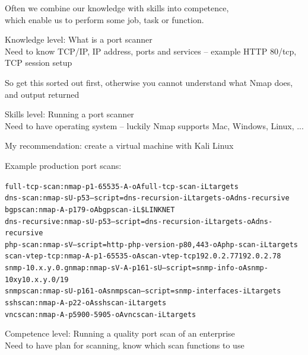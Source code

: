 \documentclass[Screen16to9,17pt]{foils}
\begin{document}
{\large Often we combine our knowledge with skills into competence, \\
which enable us to perform some job, task or function.}

\begin{list2}
\item Knowledge level: What is a port scanner\\
Need to know TCP/IP, IP address, ports and services -- example HTTP 80/tcp, TCP session setup
\end{list2}

So get this sorted out first, otherwise you cannot understand what Nmap does, and output returned




\begin{list2}
\item Skills level: Running a port scanner\\
Need to have operating system -- luckily Nmap supports Mac, Windows, Linux, ...
\item My recommendation: create a virtual machine with Kali Linux
\end{list2}


Example production port scans:
\begin{alltt}\footnotesize
full-tcp-scan: nmap -p 1-65535 -A -oA full-tcp-scan -iL targets
dns-scan: nmap -sU -p 53 --script=dns-recursion -iL targets -oA dns-recursive
bgpscan: nmap -A -p 179 -oA bgpscan -iL \$LINKNET
dns-recursive: nmap -sU -p 53 --script=dns-recursion -iL targets -oA dns-recursive
php-scan: nmap -sV --script=http-php-version -p80,443 -oA php-scan -iL targets
scan-vtep-tcp: nmap -A -p 1-65535 -oA scan-vtep-tcp 192.0.2.77 192.0.2.78
snmp-10.x.y.0.gnmap: nmap -sV -A -p 161 -sU --script=snmp-info -oA snmp-10xy 10.x.y.0/19
snmpscan: nmap -sU -p 161 -oA snmpscan --script=snmp-interfaces -iL targets
sshscan: nmap -A -p 22 -oA sshscan -iL targets
vncscan: nmap -A -p 5900-5905 -oA vncscan -iL targets
\end{alltt}

\begin{list2}
\item Competence level: Running a quality port scan of an enterprise\\
Need to have plan for scanning, know which scan functions to use
\end{list2}
\end{document}
